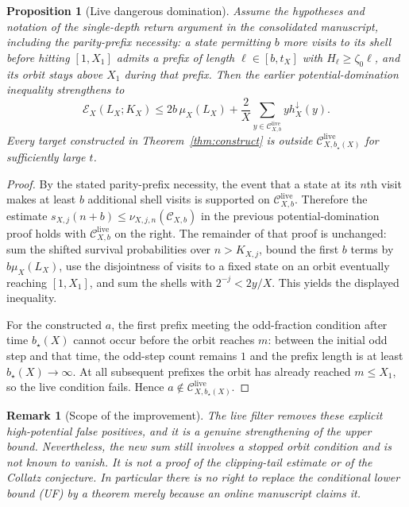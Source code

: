 \documentclass[11pt,a4paper]{article}
\newtheorem{proposition}[theorem]{Proposition}
\newtheorem{remark}[theorem]{Remark}
\newcommand{\calC}{\mathcal C}
\begin{document}
\begin{proposition}[Live dangerous domination]\label{prop:live}
Assume the hypotheses and notation of the single-depth return argument in the consolidated manuscript, including the parity-prefix necessity: a state permitting $b$ more visits to its shell before hitting $[1,X_1]$ admits a prefix of length $\ell\in[b,t_X]$ with $H_\ell\ge\zeta_0\ell$, and its orbit stays above $X_1$ during that prefix.  Then the earlier potential-domination inequality strengthens to
\[
 \boxed{\quad
 \mathcal E_X(L_X;K_X)\le2b\,\mu_X(L_X)
 +\frac2X\sum_{y\in\calC^{\mathrm{live}}_{X,b}}y h_X^\downarrow(y).
 \quad}
\]
Every target constructed in Theorem~\ref{thm:construct} is outside $\calC^{\mathrm{live}}_{X,b_\star(X)}$ for sufficiently large $t$.
\end{proposition}
\begin{proof}
By the stated parity-prefix necessity, the event that a state at its $n$th visit makes at least $b$ additional shell visits is supported on $\calC^{\mathrm{live}}_{X,b}$.  Therefore the estimate $s_{X,j}(n+b)\le\nu_{X,j,n}(\calC_{X,b})$ in the previous potential-domination proof holds with $\calC^{\mathrm{live}}_{X,b}$ on the right.  The remainder of that proof is unchanged: sum the shifted survival probabilities over $n>K_{X,j}$, bound the first $b$ terms by $b\mu_X(L_X)$, use the disjointness of visits to a fixed state on an orbit eventually reaching $[1,X_1]$, and sum the shells with $2^{-j}<2y/X$.  This yields the displayed inequality.

For the constructed $a$, the first prefix meeting the odd-fraction condition after time $b_\star(X)$ cannot occur before the orbit reaches $m$: between the initial odd step and that time, the odd-step count remains $1$ and the prefix length is at least $b_\star(X)\to\infty$.  At all subsequent prefixes the orbit has already reached $m\le X_1$, so the live condition fails.  Hence $a\notin\calC^{\mathrm{live}}_{X,b_\star(X)}$.
\end{proof}

\begin{remark}[Scope of the improvement]
The live filter removes these explicit high-potential false positives, and it is a genuine strengthening of the \emph{upper bound}.  Nevertheless, the new sum still involves a stopped orbit condition and is not known to vanish.  It is not a proof of the clipping-tail estimate or of the Collatz conjecture.  In particular there is no right to replace the conditional lower bound (UF) by a theorem merely because an online manuscript claims it.
\end{remark}
\end{document}
